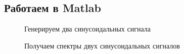 \documentclass[12pt,a4paper]{scrartcl}
\begin{document}
\subsection{Работаем в Matlab}
\label{sec:workMatlab}
\begin{figure}[h!]
\caption{Генерируем два синусоидальных сигнала}
\end{figure}

\begin{figure}[h!]
\caption{Получаем спектры двух синусоидальных сигналов}
\end{figure}
\end{document}
